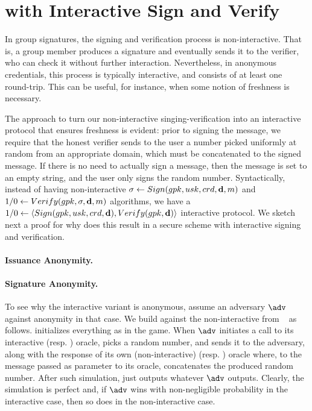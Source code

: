 \section{\CUASGen with Interactive Sign and Verify}
\label{app:interactive-uas}


In group signatures, the signing and verification process is non-interactive.
That is, a group member produces a signature and eventually sends it to the
verifier, who can check it without further interaction. Nevertheless, in
anonymous credentials, this process is typically interactive, and consists of
at least one round-trip. This can be useful, for instance, when some notion of
freshness is necessary.

The approach to turn our non-interactive singing-verification into an
interactive protocol that ensures freshness is evident: prior to signing the
message, we require that the honest verifier sends to the user a number picked
uniformly at random from an appropriate domain, which must be concatenated to
the signed message. If there is no need to actually sign a message, then the
message is set to an empty string, and the user only signs the random number.
%
Syntactically, instead of having non-interactive $\sigma \gets Sign(gpk,usk,
crd,\mathbf{d},m)$ and $1/0 \gets Verify(gpk,\sigma,\mathbf{d},m)$ algorithms,
we have a $1/0 \gets \langle Sign(gpk,usk,crd,\mathbf{d}),Verify(gpk,
\mathbf{d}) \rangle$ interactive protocol.
%
We sketch next a proof for why does this result in a secure \GSAC scheme with
interactive signing and verification.

\paragraph{Issuance Anonymity.} 

\paragraph{Signature Anonymity.} To see why the interactive variant is
anonymous, assume an adversary $\adv$ against anonymity in that case. We build
\advB against the non-interactive \ExpGSACSigAnonb from \adv~ as follows. \advB
initializes
everything as in the \ExpGSACSigAnonb game. When $\adv$ initiates a call to its
interactive \SIGN (resp. \CHALb) oracle, \advB picks a random number, and sends
it to the adversary, along with the response of its own (non-interactive) \SIGN
(resp. \CHALb) oracle where, to the message passed as parameter to its oracle,
concatenates the produced random number. After such simulation, \advB just
outputs whatever $\adv$ outputs. Clearly, the simulation is perfect and, if
$\adv$ wins with non-negligible probability in the interactive case, then so
does \advB in the non-interactive case.

